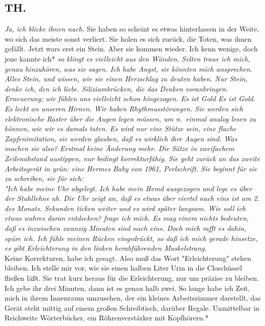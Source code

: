 \documentclass[
]{article}
\author{}
\date{\vspace{-2.5em}}
\begin{document}
\subsection{TH.}\label{th.}

\emph{Ja, ich blicke ihnen nach.} Sie haben so scheint es etwas
hinterlassen in der Weite, wo sich das meiste sonst verliert. Sie holen
es sich zurück, die Toten, was ihnen gefällt. Jetzt wars erst ein Stein.
Aber sie kommen wieder. Ich kenn wenige, doch jene kannte ich* \emph{so
klingt es vielleicht aus den Wänden. Selten traue ich mich, genau
hinzuhören, was sie sagen. Ich habe Angst, sie könnten mich ansprechen.
Alles Stein, und wissen, wie sie einen Herzschlag zu deuten haben. Nur
Stein, denke ich, den ich liebe. Siliziumbrücken, die das Denken
voranbringen. Erneuerung; wir fühlen uns vielleicht schon hingezogen. Es
ist Gold Es ist Gold. Es leckt an unseren Hirnen. Wir haben
Rhythmusstörungen. Sie werden sich elektronische Raster über die Augen
legen müssen, um n.~einmal analog lesen zu können, wie wir es damals
taten. Es wird nur eine Stütze sein, eine flache Zapfenimitation, sie
werden glauben, daß es wirklich ihre Augen sind. Was machen sie also?
Erstmal keine Änderung mehr. Die Sätze in zweifachem Zeilenabstand
austippen, nur bedingt korrekturfähig. Sie geht zurück an das zweite
Arbeitsgerät in grün: eine Hermes Baby von 1961, Perlschrift. Sie
beginnt für sie zu schreiben, sie für sich:\\
"Ich habe meine Uhr abgelegt. Ich habe mein Hemd ausgezogen und lege es
über der Stuhllehne ab. Die Uhr zeigt an, daß es etwas über viertel nach
eins ist am 2. des Monats. Sekunden ticken weiter und es wird später
langsam. Wie soll ich etwas wahres daran entdecken? frage ich mich. Es
mag einem nichts bedeuten, daß es inzwischen zwanzig Minuten sind nach
eins. Doch mich rafft es dahin, spüre ich. Ich fühle meinen Rücken
eingedrückt, so daß ich mich gerade hinsetze, es gibt Erleichterung in
den linken herabführenden Muskelstrang.\\
}Keine Korrekturen, habe ich gesagt. Also muß das Wort "Erleichterung"
stehen bleiben. Ich stelle mir vor, wie sie einen halben Liter Urin in
die Closchüssel fließen läßt. Sie trat kurz heraus für die
Erleichterung, nur um präzise zu bleiben. Ich gebe ihr drei Minuten,
dann ist es genau halb zwei. So lange habe ich Zeit, mich in ihrem
Innenraum umzusehen, der ein kleines Arbeitszimmer darstellt, das Gerät
steht mittig auf einem großen Schreibtisch, darüber Regale. Unmittelbar
in Reichweite Wörterbücher, ein Röhrenverstärker mit Kopfhörern.*\\
\end{document}
